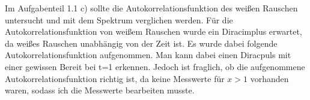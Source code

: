 \documentclass{article}						%
\begin{document}
		Im Aufgabenteil 1.1 c) sollte die Autokorrelationsfunktion des weißen Rauschen untersucht und mit dem Spektrum verglichen werden. Für die Autokorrelationsfunktion von weißem Rauschen wurde ein Diracimplus erwartet, da weißes Rauschen unabhängig von der Zeit ist. Es wurde dabei folgende Autokorrelationsfunktion aufgenommen. Man kann dabei einen Diracpuls mit einer gewissen Bereit bei t=\SI{1}{\sec} erkennen. Jedoch ist fraglich, ob die aufgenommene Autokorrelationsfunktion richtig ist, da keine Messwerte für $ x>1 $ vorhanden waren, sodass ich die Messwerte bearbeiten musste.
		\clearpage
		
		\begin{figure}[h!]
		\end{figure}
		
\end{document}
